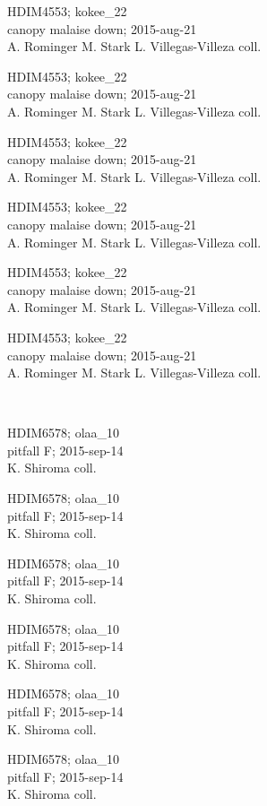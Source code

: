 \documentclass[2pt]{extarticle}
\begin{document}
\noindent
\parbox{0.16\textwidth}{\tiny \raggedright \rule[-0.3\baselineskip]{0pt}{10pt}HDIM4553; kokee\_22\\ canopy malaise down; 2015-aug-21\\ A. Rominger M. Stark L. Villegas-Villeza coll.}
\parbox{0.16\textwidth}{\tiny \raggedright \rule[-0.3\baselineskip]{0pt}{10pt}HDIM4553; kokee\_22\\ canopy malaise down; 2015-aug-21\\ A. Rominger M. Stark L. Villegas-Villeza coll.}
\parbox{0.16\textwidth}{\tiny \raggedright \rule[-0.3\baselineskip]{0pt}{10pt}HDIM4553; kokee\_22\\ canopy malaise down; 2015-aug-21\\ A. Rominger M. Stark L. Villegas-Villeza coll.}
\parbox{0.16\textwidth}{\tiny \raggedright \rule[-0.3\baselineskip]{0pt}{10pt}HDIM4553; kokee\_22\\ canopy malaise down; 2015-aug-21\\ A. Rominger M. Stark L. Villegas-Villeza coll.}
\parbox{0.16\textwidth}{\tiny \raggedright \rule[-0.3\baselineskip]{0pt}{10pt}HDIM4553; kokee\_22\\ canopy malaise down; 2015-aug-21\\ A. Rominger M. Stark L. Villegas-Villeza coll.}
\parbox{0.16\textwidth}{\tiny \raggedright \rule[-0.3\baselineskip]{0pt}{10pt}HDIM4553; kokee\_22\\ canopy malaise down; 2015-aug-21\\ A. Rominger M. Stark L. Villegas-Villeza coll.} \\ 
\vspace{0.001in} 

\noindent
\parbox{0.16\textwidth}{\tiny \raggedright \rule[-0.3\baselineskip]{0pt}{10pt}HDIM6578; olaa\_10\\ pitfall F; 2015-sep-14\\ K. Shiroma coll.}
\parbox{0.16\textwidth}{\tiny \raggedright \rule[-0.3\baselineskip]{0pt}{10pt}HDIM6578; olaa\_10\\ pitfall F; 2015-sep-14\\ K. Shiroma coll.}
\parbox{0.16\textwidth}{\tiny \raggedright \rule[-0.3\baselineskip]{0pt}{10pt}HDIM6578; olaa\_10\\ pitfall F; 2015-sep-14\\ K. Shiroma coll.}
\parbox{0.16\textwidth}{\tiny \raggedright \rule[-0.3\baselineskip]{0pt}{10pt}HDIM6578; olaa\_10\\ pitfall F; 2015-sep-14\\ K. Shiroma coll.}
\parbox{0.16\textwidth}{\tiny \raggedright \rule[-0.3\baselineskip]{0pt}{10pt}HDIM6578; olaa\_10\\ pitfall F; 2015-sep-14\\ K. Shiroma coll.}
\parbox{0.16\textwidth}{\tiny \raggedright \rule[-0.3\baselineskip]{0pt}{10pt}HDIM6578; olaa\_10\\ pitfall F; 2015-sep-14\\ K. Shiroma coll.} \\ 
\vspace{0.001in} 
\end{document}
